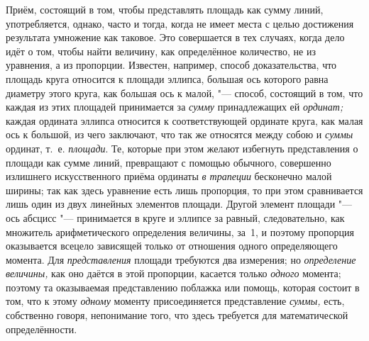 Приём, состоящий в том, чтобы представлять площадь как сумму линий,
употребляется, однако, часто и тогда, когда не имеет места с целью достижения
результата умножение как таковое. Это совершается в тех случаях, когда дело
идёт о том, чтобы найти величину, как определённое количество, не из уравнения,
а из пропорции. Известен, например, способ доказательства, что площадь круга
относится к площади эллипса, большая ось которого равна диаметру этого круга,
как большая ось к малой, "--- способ, состоящий в том, что каждая из этих
площадей принимается за {\em сумму} принадлежащих ей {\em ординат;} каждая
ордината эллипса относится к соответствующей ординате круга, как малая ось
к большой, из чего заключают, что так же относятся между собою и {\em суммы}
ординат, т.~е. {\em площади}. Те, которые при этом желают избегнуть
представления о площади как сумме линий, превращают с помощью обычного,
совершенно излишнего искусственного приёма ординаты {\em в трапеции} бесконечно
малой ширины; так как здесь уравнение есть лишь пропорция, то при этом
сравнивается лишь один из двух линейных элементов площади. Другой элемент
площади "--- ось абсцисс "--- принимается в круге и эллипсе за равный,
следовательно, как множитель арифметического определения величины, за~1, и
поэтому пропорция оказывается всецело зависящей только от отношения одного
определяющего момента. Для {\em представления} площади требуются два измерения;
но {\em определение величины,} как оно даётся в этой пропорции, касается только
{\em одного} момента; поэтому та оказываемая представлению поблажка или помощь,
которая состоит в том, что к этому {\em одному} моменту присоединяется
представление {\em суммы,} есть, собственно говоря, непонимание того, что здесь
требуется для математической определённости.

